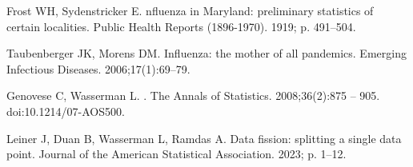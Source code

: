 \documentclass[10pt,letterpaper]{article}
\begin{document}
\begin{thebibliography}{10}
  Frost WH, Sydenstricker E.
  nfluenza in {M}aryland: preliminary statistics of certain
    localities.
  \newblock Public Health Reports (1896-1970). 1919; p. 491--504.
  
  Taubenberger JK, Morens DM.
   {I}nfluenza: the mother of all pandemics.
  \newblock Emerging Infectious Diseases. 2006;17(1):69--79.
  
  Genovese C, Wasserman L.
  .
  \newblock The Annals of Statistics. 2008;36(2):875 -- 905.
  \newblock doi:{10.1214/07-AOS500}.
  
  Leiner J, Duan B, Wasserman L, Ramdas A.
  \newblock Data fission: splitting a single data point.
  \newblock Journal of the American Statistical Association. 2023; p. 1--12.
  
\end{thebibliography}

 

\end{document}
